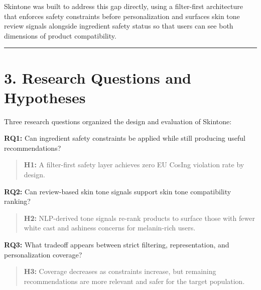 \documentclass[
  letterpaper,
  DIV=11,
  numbers=noendperiod]{scrartcl}
\begin{document}
Skintone was built to address this gap directly, using a filter-first
architecture that enforces safety constraints before personalization and
surfaces skin tone review signals alongside ingredient safety status so
that users can see both dimensions of product compatibility.

\begin{center}\rule{0.5\linewidth}{0.5pt}\end{center}

\section{3. Research Questions and
Hypotheses}\label{research-questions-and-hypotheses}

Three research questions organized the design and evaluation of
Skintone:

\textbf{RQ1:} Can ingredient safety constraints be applied while still
producing useful recommendations?

\begin{quote}
\textbf{H1:} A filter-first safety layer achieves zero EU CosIng
violation rate by design.
\end{quote}

\textbf{RQ2:} Can review-based skin tone signals support skin tone
compatibility ranking?

\begin{quote}
\textbf{H2:} NLP-derived tone signals re-rank products to surface those
with fewer white cast and ashiness concerns for melanin-rich users.
\end{quote}

\textbf{RQ3:} What tradeoff appears between strict filtering,
representation, and personalization coverage?

\begin{quote}
\textbf{H3:} Coverage decreases as constraints increase, but remaining
recommendations are more relevant and safer for the target population.
\end{quote}
\end{document}
